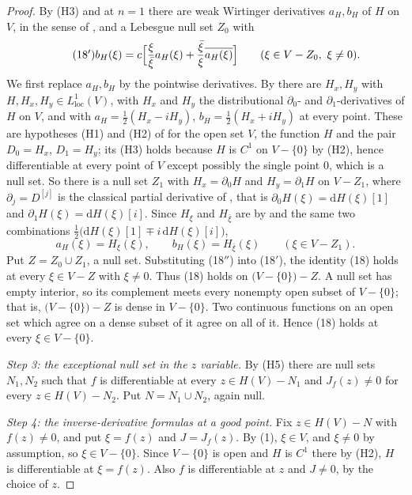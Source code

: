 \begin{proof}
By (H3) and  at $n=1$ there are weak Wirtinger
derivatives $a_H,b_H$ of $H$ on $V$, in the sense of
, and a Lebesgue null set $Z_0$ with
\begin{equation}\tag{18$'$}
  b_H(\xi)=c\Bigl[\frac{\xi}{\bar\xi}a_H(\xi)
    +\frac{\bar\xi}{\xi}\overline{a_H(\xi)}\Bigr]
  \qquad(\xi\in V-Z_0,\ \xi\neq0).
\end{equation}
We first replace $a_H,b_H$ by the pointwise derivatives.  By
 there are $H_x,H_y$ with
$H,H_x,H_y\in L^1_{\mathrm{loc}}(V)$, with $H_x$ and $H_y$ the distributional
$\partial_0$- and $\partial_1$-derivatives of $H$ on $V$, and with
$a_H=\tfrac12(H_x-iH_y)$, $b_H=\tfrac12(H_x+iH_y)$ at every point.  These are
hypotheses (H1) and (H2) of  for the open set
$V$, the function $H$ and the pair $D_0=H_x$, $D_1=H_y$; its (H3) holds
because $H$ is $C^1$ on $V-\{0\}$ by (H2), hence differentiable at every point
of $V$ except possibly the single point $0$, which is a null set.  So there is
a null set $Z_1$ with $H_x=\partial_0H$ and $H_y=\partial_1H$ on $V-Z_1$,
where $\partial_j=D^{[j]}$ is the classical partial derivative of
, that is $\partial_0H(\xi)=\mathrm{d}H(\xi)[1]$ and
$\partial_1H(\xi)=\mathrm{d}H(\xi)[i]$.  Since $H_\xi$ and $H_{\bar\xi}$ are
by  and  the same two combinations
$\tfrac12\bigl(\mathrm{d}H(\xi)[1]\mp i\,\mathrm{d}H(\xi)[i]\bigr)$,
\begin{equation}\tag{18$''$}
  a_H(\xi)=H_\xi(\xi),\qquad b_H(\xi)=H_{\bar\xi}(\xi)\qquad(\xi\in V-Z_1).
\end{equation}
Put $Z=Z_0\cup Z_1$, a null set.  Substituting (18$''$) into (18$'$), the
identity (18) holds at every $\xi\in V-Z$ with $\xi\neq0$.
Thus (18) holds on $\bigl(V-\{0\}\bigr)-Z$.  A null set has empty interior, so
its complement meets every nonempty open subset of $V-\{0\}$; that is,
$\bigl(V-\{0\}\bigr)-Z$ is dense in $V-\{0\}$.  Two continuous functions on an
open set which agree on a dense subset of it agree on all of it.  Hence (18)
holds at every $\xi\in V-\{0\}$.

\emph{Step 3: the exceptional null set in the $z$ variable.}  By (H5) there are
null sets $N_1,N_2$ such that $f$ is differentiable at every $z\in H(V)-N_1$
and $J_f(z)\neq0$ for every $z\in H(V)-N_2$.  Put $N=N_1\cup N_2$, again null.

\emph{Step 4: the inverse-derivative formulas at a good point.}  Fix
$z\in H(V)-N$ with $f(z)\neq0$, and put $\xi=f(z)$ and $J=J_f(z)$.  By (1),
$\xi\in V$, and $\xi\neq0$ by assumption, so $\xi\in V-\{0\}$.  Since
$V-\{0\}$ is open and $H$ is $C^1$ there by (H2), $H$ is differentiable at
$\xi=f(z)$.  Also $f$ is differentiable at $z$ and $J\neq0$, by the choice of
$z$.


\end{proof}
